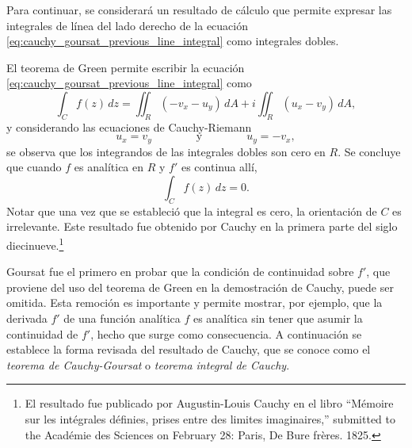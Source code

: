 \documentclass[a4paper]{report}
\begin{document}
Para continuar, se considerará un resultado de cálculo que permite expresar las integrales de línea del lado derecho de la ecuación \ref{eq:cauchy_goursat_previous_line_integral} como integrales dobles.

\medskip
\noindent
{} 

\medskip 
\noindent
El teorema de Green permite escribir la ecuación \ref{eq:cauchy_goursat_previous_line_integral} como
\begin{equation}\label{eq:cauchy_goursat_theorem_contour_integral_with_green_theorem}
 \int_C f(z)\,dz=\iint_R(-v_x-u_y)\,dA+i\iint_R(u_x-v_y)\,dA,  
\end{equation}
y considerando las ecuaciones de Cauchy-Riemann
\[
 u_x=v_y
 \qquad\qquad\textrm{y}\qquad\qquad
 u_y=-v_x,
\]
se observa que los integrandos de las integrales dobles son cero en \(R\). Se concluye que cuando \(f\) es analítica en \(R\) y \(f'\) es continua allí, 
\[
 \int_C f(z)\,dz=0. 
\]
Notar que una vez que se estableció que la integral es cero, la orientación de \(C\) es irrelevante. Este resultado fue obtenido por Cauchy en la primera parte del siglo diecinueve.\footnote{El resultado fue publicado por Augustin-Louis Cauchy en el libro ``Mémoire sur les intégrales définies, prises entre des limites imaginaires,'' submitted to the Académie des Sciences on February 28: Paris, De Bure frères. 1825.}

Goursat fue el primero en probar que la condición de continuidad sobre \(f'\), que proviene del uso del teorema de Green en la demostración de Cauchy, puede ser omitida. Esta remoción es importante y permite mostrar, por ejemplo, que la derivada \(f'\) de una función analítica \(f\) es analítica sin tener que asumir la continuidad de \(f'\), hecho que surge como consecuencia. A continuación se establece la forma revisada del resultado de Cauchy, que se conoce como el \emph{teorema de Cauchy-Goursat} o \emph{teorema integral de Cauchy}.
\end{document}
